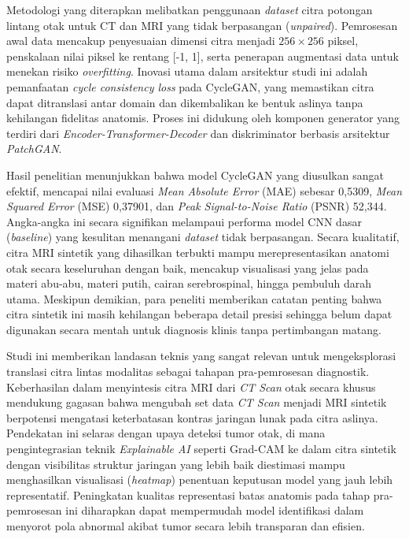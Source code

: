 Metodologi yang diterapkan melibatkan penggunaan \textit{dataset} citra potongan lintang otak untuk CT dan MRI yang tidak berpasangan (\textit{unpaired}). Pemrosesan awal data mencakup penyesuaian dimensi citra menjadi $256 \times 256$ piksel, penskalaan nilai piksel ke rentang [-1, 1], serta penerapan augmentasi data untuk menekan risiko \textit{overfitting}. Inovasi utama dalam arsitektur studi ini adalah pemanfaatan \textit{cycle consistency loss} pada CycleGAN, yang memastikan citra dapat ditranslasi antar domain dan dikembalikan ke bentuk aslinya tanpa kehilangan fidelitas anatomis. Proses ini didukung oleh komponen generator yang terdiri dari \textit{Encoder-Transformer-Decoder} dan diskriminator berbasis arsitektur \textit{PatchGAN}.

Hasil penelitian menunjukkan bahwa model CycleGAN yang diusulkan sangat efektif, mencapai nilai evaluasi \textit{Mean Absolute Error} (MAE) sebesar 0,5309, \textit{Mean Squared Error} (MSE) 0,37901, dan \textit{Peak Signal-to-Noise Ratio} (PSNR) 52,344. Angka-angka ini secara signifikan melampaui performa model CNN dasar (\textit{baseline}) yang kesulitan menangani \textit{dataset} tidak berpasangan. Secara kualitatif, citra MRI sintetik yang dihasilkan terbukti mampu merepresentasikan anatomi otak secara keseluruhan dengan baik, mencakup visualisasi yang jelas pada materi abu-abu, materi putih, cairan serebrospinal, hingga pembuluh darah utama. Meskipun demikian, para peneliti memberikan catatan penting bahwa citra sintetik ini masih kehilangan beberapa detail presisi sehingga belum dapat digunakan secara mentah untuk diagnosis klinis tanpa pertimbangan matang.

Studi ini memberikan landasan teknis yang sangat relevan untuk mengeksplorasi translasi citra lintas modalitas sebagai tahapan pra-pemrosesan diagnostik. Keberhasilan \textcite{Jha2024CTtoMRI} dalam menyintesis citra MRI dari \textit{CT Scan} otak secara khusus mendukung gagasan bahwa mengubah set data \textit{CT Scan} menjadi MRI sintetik berpotensi mengatasi keterbatasan kontras jaringan lunak pada citra aslinya. Pendekatan ini selaras dengan upaya deteksi tumor otak, di mana pengintegrasian teknik \textit{Explainable AI} seperti Grad-CAM ke dalam citra sintetik dengan visibilitas struktur jaringan yang lebih baik diestimasi mampu menghasilkan visualisasi (\textit{heatmap}) penentuan keputusan model yang jauh lebih representatif. Peningkatan kualitas representasi batas anatomis pada tahap pra-pemrosesan ini diharapkan dapat mempermudah model identifikasi dalam menyorot pola abnormal akibat tumor secara lebih transparan dan efisien.

